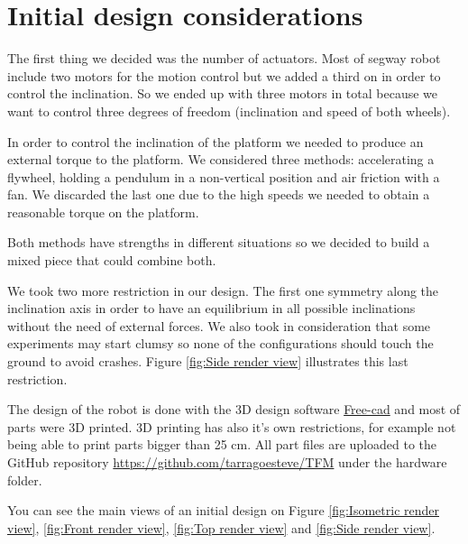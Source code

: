 \section{Initial design considerations}
The first thing we decided was the number of actuators.
Most of segway robot include two motors for the motion control but
we added a third on in order to control the inclination.
So we ended up with three motors in total because we want to control
three degrees of freedom (inclination and speed of both wheels).

In order to control the inclination of the platform we needed to produce
an external torque to the platform. We considered three methods: accelerating
a flywheel, holding a pendulum in a non-vertical position and air friction
with a fan. We discarded the last one due to the high speeds we needed to obtain
a reasonable torque on the platform.

Both methods have strengths in different situations so we decided to build a mixed
piece that could combine both. 

We took two more restriction in our design. The first one symmetry along the 
inclination axis in order to have an equilibrium in all possible inclinations
without the need of external forces. 
We also took in consideration that some experiments may start clumsy so none of
the configurations should touch the ground to avoid crashes. Figure \ref{fig:Side render view}
illustrates this last restriction.   

The design of the robot is done with the 3D design software 
\href{https://www.freecadweb.org/}{Free-cad} and most of parts were 3D printed. 3D printing has
also it's own restrictions, for example not being able to print parts bigger than 25 cm.
All part files are uploaded to the GitHub repository \url{https://github.com/tarragoesteve/TFM} under the hardware folder.

You can see the main views of an initial design on Figure \ref{fig:Isometric render view}, \ref{fig:Front render view}, \ref{fig:Top render view} and \ref{fig:Side render view}.

